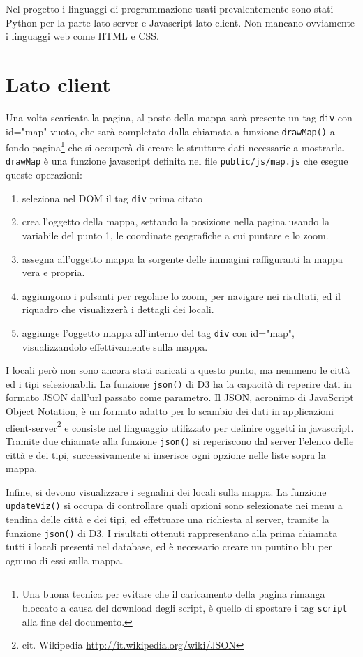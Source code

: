 Nel progetto i linguaggi di programmazione usati prevalentemente sono stati Python per la parte lato server e Javascript lato client. Non mancano ovviamente i linguaggi web come HTML e CSS.

\section{Lato client}
Una volta scaricata la pagina, al posto della mappa sarà presente un tag \texttt{div} con id="map" vuoto, che sarà completato dalla chiamata a funzione \texttt{drawMap()} a fondo pagina\footnote{Una buona tecnica per evitare che il caricamento della pagina rimanga bloccato a causa del download degli script, è quello di spostare i tag \texttt{script} alla fine del documento.} che si occuperà di creare le strutture dati necessarie a mostrarla. 
\texttt{drawMap} è una funzione javascript definita nel file \texttt{public/js/map.js} che esegue queste operazioni:
\begin{enumerate}
\item seleziona nel DOM il tag \texttt{div} prima citato
\item crea l'oggetto della mappa, settando la posizione nella pagina usando la variabile del punto 1, le coordinate geografiche a cui puntare e lo zoom.
\item assegna all'oggetto mappa la sorgente delle immagini raffiguranti la mappa vera e propria.
\item aggiungono i pulsanti per regolare lo zoom, per navigare nei risultati, ed il riquadro che visualizzerà i dettagli dei locali.
\item aggiunge l'oggetto mappa all'interno del tag \texttt{div} con id="map", visualizzandolo effettivamente sulla mappa.
\end{enumerate}

I locali però non sono ancora stati caricati a questo punto, ma nemmeno le città ed i tipi selezionabili. La funzione \texttt{json()} di D3 ha la capacità di reperire dati in formato JSON dall'url passato come parametro. Il JSON, acronimo di JavaScript Object Notation, è un formato adatto per lo scambio dei dati in applicazioni client-server\footnote{cit. Wikipedia \url{http://it.wikipedia.org/wiki/JSON}} e consiste nel linguaggio utilizzato per definire oggetti in javascript. Tramite due chiamate alla funzione \texttt{json()} si reperiscono dal server l'elenco delle città e dei tipi, successivamente si inserisce ogni opzione nelle liste sopra la mappa.

Infine, si devono visualizzare i segnalini dei locali sulla mappa. La funzione \texttt{updateViz()} si occupa di controllare quali opzioni sono selezionate nei menu a tendina delle città e dei tipi, ed effettuare una richiesta al server, tramite la funzione \texttt{json()} di D3. I risultati ottenuti rappresentano alla prima chiamata tutti i locali presenti nel database, ed è necessario creare un puntino blu per ognuno di essi sulla mappa.

